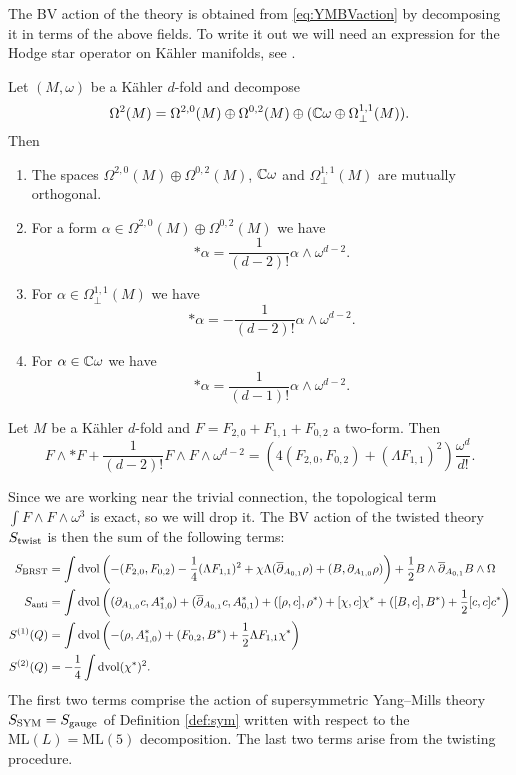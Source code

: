\documentclass[10pt, oneside]{article}
\newcommand{\ML}{\mathrm{ML}}
\begin{document}
The BV action of the theory is obtained from \eqref{eq:YMBVaction} by decomposing it in terms of the above fields. To write it out we will need an expression for the Hodge star operator on K\"{a}hler manifolds, see \cite[Proposition 1.2.31]{Huybrechts}.

\begin{prop}
Let $(M, \omega)$ be a K\"{a}hler $d$-fold and decompose
\[\Omega^2(M) = \Omega^{2, 0}(M)\oplus \Omega^{0, 2}(M)\oplus (\mathbb C\omega\oplus \Omega^{1, 1}_\perp(M)).\]
Then
\begin{enumerate}
\item The spaces $\Omega^{2, 0}(M)\oplus \Omega^{0, 2}(M)$, $\mathbb C\omega$ and $\Omega^{1, 1}_\perp(M)$ are mutually orthogonal.

\item For a form $\alpha\in\Omega^{2, 0}(M)\oplus \Omega^{0, 2}(M)$ we have
\[\ast \alpha = \frac{1}{(d-2)!} \alpha\wedge \omega^{d-2}.\]

\item For $\alpha\in \Omega^{1, 1}_\perp(M)$ we have
\[\ast\alpha = -\frac{1}{(d-2)!} \alpha\wedge \omega^{d-2}.\]

\item For $\alpha\in\mathbb C\omega$ we have
\[\ast \alpha = \frac{1}{(d-1)!} \alpha\wedge \omega^{d-2}.\]
\end{enumerate}
\end{prop}

\begin{corollary} \label{Kahler_YM_term_cor}
Let $M$ be a K\"{a}hler $d$-fold and $F = F_{2, 0} + F_{1, 1} + F_{0, 2}$ a two-form. Then
\[F\wedge \ast F + \frac{1}{(d-2)!} F\wedge F\wedge \omega^{d-2} = \left(4(F_{2, 0}, F_{0, 2}) + (\Lambda F_{1, 1})^2\right) \frac{\omega^d}{d!}.\]
\end{corollary}

Since we are working near the trivial connection, the topological term $\int F\wedge F\wedge \omega^3$ is exact, so we will drop it. The BV action of the twisted theory $S_{\mathrm{twist}}$ is then the sum of the following terms:
\begin{align}
S_{\mathrm{BRST}} &= \int \operatorname{dvol} \left(-(F_{2, 0}, F_{0, 2}) - \frac{1}{4}(\Lambda F_{1, 1})^2 + \chi \Lambda(\overline{\partial}_{A_{0, 1}}\rho) + (B, \partial_{A_{1, 0}} \rho)\right)  + \frac{1}{2}B\wedge \overline{\partial}_{A_{0, 1}} B\wedge\Omega \label{eq:10dBRST} \\
S_{\mathrm{anti}} &= \int \operatorname{dvol}\left((\partial_{A_{1, 0}} c, A_{1, 0}^*) + (\overline{\partial}_{A_{0, 1}} c, A_{0, 1}^*) + ([\rho, c], \rho^*) + [\chi, c]\chi^* + ([B, c], B^*) + \frac{1}{2}[c, c]c^*\right) \label{eq:10danti} \\
S^{(1)}(Q) &= \int \operatorname{dvol}\left(-(\rho, A_{1, 0}^*) + (F_{0, 2}, B^*) + \frac{1}{2}\Lambda F_{1, 1} \chi^*\right) \\
S^{(2)}(Q) &= -\frac{1}{4}\int \operatorname{dvol} (\chi^*)^2.
\end{align}
The first two terms comprise the action of supersymmetric Yang--Mills theory $S_{\rm SYM} = S_{\rm gauge}$ of Definition \ref{def:sym} written with respect to the $\ML(L) = \ML(5)$ decomposition. 
The last two terms arise from the twisting procedure.
\end{document}
